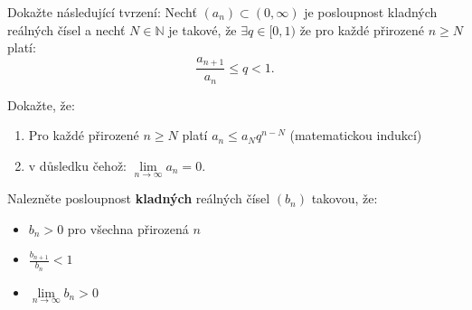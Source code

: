 
Dokažte následující tvrzení:
Nechť $(a_n) \subset (0, \infty)$ je posloupnost kladných reálných čísel a nechť $N \in \mathbb{N}$ je takové, že $\exists q \in [0,1)$ že pro každé přirozené $n \geq N$ platí:
$$\frac{a_{n+1}}{a_n} \leq q < 1.$$

Dokažte, že:
\begin{enumerate}
	\item  Pro každé přirozené $n \geq N$ platí $a_n \leq a_N q^{n - N}$ (matematickou indukcí)
	\item  v důsledku čehož: $\underset{n\rightarrow\infty}{\lim} a_n = 0$.
\end{enumerate}

Nalezněte posloupnost \textbf{kladných} reálných čísel $(b_n)$ takovou, že:
\begin{itemize}
	\item  $b_n > 0$ pro všechna přirozená $n$
	\item  $\frac{b_{n+1}}{b_n} < 1$
	\item  $\underset{n\rightarrow\infty}{\lim} b_n > 0$
\end{itemize}

